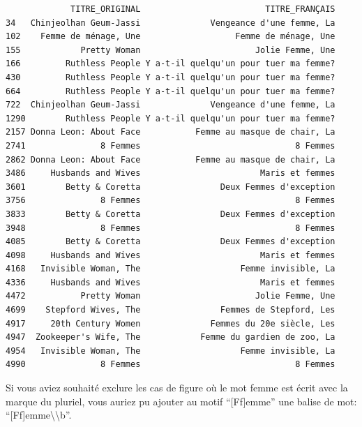 \documentclass[
  letterpaper,
  DIV=11,
  numbers=noendperiod]{scrartcl}
\newenvironment{Shaded}{\begin{snugshade}}{\end{snugshade}}
\newcommand{\AttributeTok}[1]{\textcolor[rgb]{0.40,0.45,0.13}{#1}}
\newcommand{\FunctionTok}[1]{\textcolor[rgb]{0.28,0.35,0.67}{#1}}
\newcommand{\NormalTok}[1]{\textcolor[rgb]{0.00,0.23,0.31}{#1}}
\newcommand{\SpecialCharTok}[1]{\textcolor[rgb]{0.37,0.37,0.37}{#1}}
\newcommand{\StringTok}[1]{\textcolor[rgb]{0.13,0.47,0.30}{#1}}
\begin{document}
\begin{verbatim}
             TITRE_ORIGINAL                         TITRE_FRANÇAIS
34   Chinjeolhan Geum-Jassi              Vengeance d'une femme, La
102    Femme de ménage, Une                   Femme de ménage, Une
155            Pretty Woman                       Jolie Femme, Une
166         Ruthless People Y a-t-il quelqu'un pour tuer ma femme?
430         Ruthless People Y a-t-il quelqu'un pour tuer ma femme?
664         Ruthless People Y a-t-il quelqu'un pour tuer ma femme?
722  Chinjeolhan Geum-Jassi              Vengeance d'une femme, La
1290        Ruthless People Y a-t-il quelqu'un pour tuer ma femme?
2157 Donna Leon: About Face           Femme au masque de chair, La
2741               8 Femmes                               8 Femmes
2862 Donna Leon: About Face           Femme au masque de chair, La
3486     Husbands and Wives                        Maris et femmes
3601        Betty & Coretta                Deux Femmes d'exception
3756               8 Femmes                               8 Femmes
3833        Betty & Coretta                Deux Femmes d'exception
3948               8 Femmes                               8 Femmes
4085        Betty & Coretta                Deux Femmes d'exception
4098     Husbands and Wives                        Maris et femmes
4168   Invisible Woman, The                    Femme invisible, La
4336     Husbands and Wives                        Maris et femmes
4472           Pretty Woman                       Jolie Femme, Une
4699    Stepford Wives, The                Femmes de Stepford, Les
4917     20th Century Women              Femmes du 20e siècle, Les
4947  Zookeeper's Wife, The            Femme du gardien de zoo, La
4954   Invisible Woman, The                    Femme invisible, La
4990               8 Femmes                               8 Femmes
\end{verbatim}

Si vous aviez souhaité exclure les cas de figure où le mot femme est
écrit avec la marque du pluriel, vous auriez pu ajouter au motif
``{[}Ff{]}emme'' une balise de mot:
``{[}Ff{]}emme\textbackslash\textbackslash b''.

\begin{Shaded}
\end{Shaded}
\end{document}
